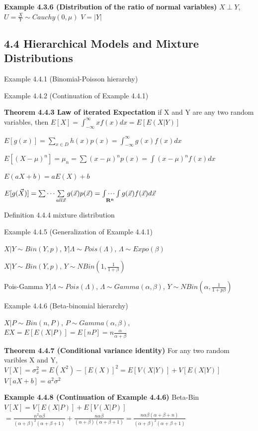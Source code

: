 \documentclass[10pt,twocolumn,portrait]{article}
\begin{document}
\textbf{Example 4.3.6 (Distribution of the ratio of normal variables)}
\(X\perp Y\),\(U=\frac{X}Y\sim Cauchy(0,\mu)\) \(V=|Y|\)

\hypertarget{hierarchical-models-and-mixture-distributions}{%
\subsection{4.4 Hierarchical Models and Mixture
Distributions}\label{hierarchical-models-and-mixture-distributions}}

Example 4.4.1 (Binomial-Poisson hierarchy)

Example 4.4.2 (Continuation of Example 4.4.1)

\textbf{Theorem 4.4.3 Law of iterated Expectation} if X and Y are any
two random variables, then
\(E[X]=\int_{-\infty}^{\infty}xf(x)dx=E[E(X|Y)]\)

\(E[g(x)]=\sum\limits_{x\in D}h(x)p(x)=\int_{-\infty}^{\infty}g(x)f(x)dx\)

\(E[(X-\mu)^n]=\mu_n=\sum{(x-\mu)^n}p(x)=\int{(x-\mu)^n}f(x)dx\)

\(E(aX+b)=aE(X)+b\)

\(E[g(\vec X)]=\sum\cdots\sum\limits_{all\vec x} g(\vec x)p(\vec x)=\idotsint\limits_{\mathbf{R^n}}g(\vec x)f(\vec x)d\vec x\)

Definition 4.4.4 mixture distribution

Example 4.4.5 (Generalization of Example 4.4.1)

\(X|Y\sim Bin(Y,p)\), \(Y|\Lambda\sim Pois(\Lambda)\),
\(\Lambda\sim Expo(\beta)\)

\(X|Y\sim Bin(Y,p)\), \(Y\sim NBin(1,\frac1{1+\beta})\)

Pois-Gamma \(Y|\Lambda\sim Pois(\Lambda)\),
\(\Lambda\sim Gamma(\alpha,\beta)\),
\(Y\sim NBin(\alpha,\frac1{1+p\beta})\)

Example 4.4.6 (Beta-binomial hierarchy)

\(X|P\sim Bin(n,P)\), \(P\sim Gamma(\alpha,\beta)\),
\(EX=E[E(X|P)]=E[nP]=n\frac{\alpha}{\alpha+\beta}\)

\textbf{Theorem 4.4.7 (Conditional variance identity)} For any two
random varibles X and Y,
\(V[X]=\sigma_{x}^2=E(X^2)-[E(X)]^2=E[V(X|Y)]+V[E(X|Y)]\)
\(V[aX+b]=a^2\sigma^2\)

\textbf{Example 4.4.8 (Continuation of Example 4.4.6)} Beta-Bin
\(V[X]=V[E(X|P)]+E[V(X|P)]\)
\(=\frac{n^2\alpha\beta}{(\alpha+\beta)^2(\alpha+\beta+1)}+\frac{n\alpha\beta}{(\alpha+\beta)(\alpha+\beta+1)}=\frac{n\alpha\beta(\alpha+\beta+n)}{(\alpha+\beta)^2(\alpha+\beta+1)}\)
\end{document}
